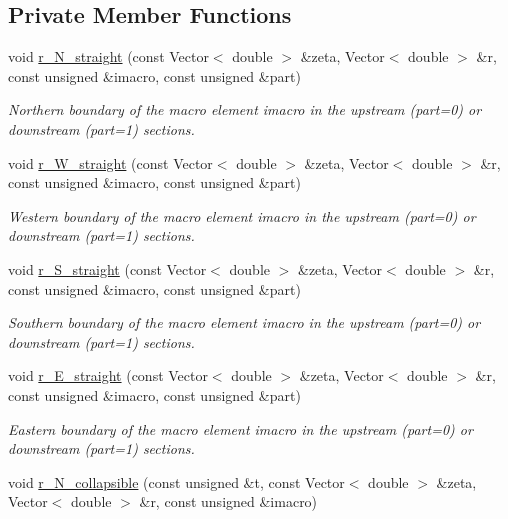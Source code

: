 \subsection*{Private Member Functions}
\begin{DoxyCompactItemize}
\item 
void \hyperlink{classoomph_1_1CollapsibleChannelDomain_aec5509d4e6a229da9fec78ceb78dcb18}{r\+\_\+\+N\+\_\+straight} (const Vector$<$ double $>$ \&zeta, Vector$<$ double $>$ \&r, const unsigned \&imacro, const unsigned \&part)
\begin{DoxyCompactList}\small\item\em Northern boundary of the macro element imacro in the upstream (part=0) or downstream (part=1) sections. \end{DoxyCompactList}\item 
void \hyperlink{classoomph_1_1CollapsibleChannelDomain_a94cebe8b3380c469cfd77924ec57d576}{r\+\_\+\+W\+\_\+straight} (const Vector$<$ double $>$ \&zeta, Vector$<$ double $>$ \&r, const unsigned \&imacro, const unsigned \&part)
\begin{DoxyCompactList}\small\item\em Western boundary of the macro element imacro in the upstream (part=0) or downstream (part=1) sections. \end{DoxyCompactList}\item 
void \hyperlink{classoomph_1_1CollapsibleChannelDomain_a12b9fbd546a2375fea2461a07b5db089}{r\+\_\+\+S\+\_\+straight} (const Vector$<$ double $>$ \&zeta, Vector$<$ double $>$ \&r, const unsigned \&imacro, const unsigned \&part)
\begin{DoxyCompactList}\small\item\em Southern boundary of the macro element imacro in the upstream (part=0) or downstream (part=1) sections. \end{DoxyCompactList}\item 
void \hyperlink{classoomph_1_1CollapsibleChannelDomain_a1f880915f7c2f9163fc1ec8cac676831}{r\+\_\+\+E\+\_\+straight} (const Vector$<$ double $>$ \&zeta, Vector$<$ double $>$ \&r, const unsigned \&imacro, const unsigned \&part)
\begin{DoxyCompactList}\small\item\em Eastern boundary of the macro element imacro in the upstream (part=0) or downstream (part=1) sections. \end{DoxyCompactList}\item 
void \hyperlink{classoomph_1_1CollapsibleChannelDomain_a0044d3e848b4c643a8a30f4f00a88e8d}{r\+\_\+\+N\+\_\+collapsible} (const unsigned \&t, const Vector$<$ double $>$ \&zeta, Vector$<$ double $>$ \&r, const unsigned \&imacro)

\end{DoxyCompactItemize}
